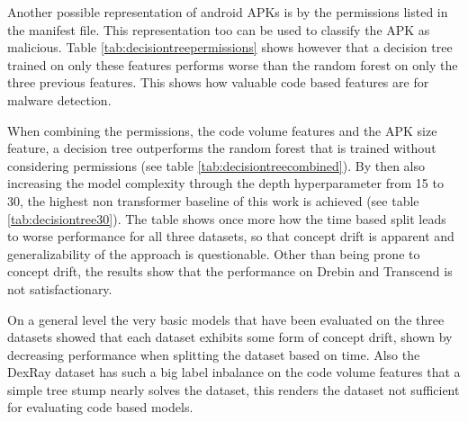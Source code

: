 Another possible representation of android APKs is by the permissions listed in the manifest file.
This representation too can be used to classify the APK as malicious.
Table \ref{tab:decisiontreepermissions} shows however that a decision tree trained on only these features 
performs worse than the random forest on only the three previous features.
This shows how valuable code based features are for malware detection.

When combining the permissions, the code volume features and the APK size feature, 
a decision tree outperforms the random forest that is trained without considering permissions (see table \ref{tab:decisiontreecombined}).
By then also increasing the model complexity through the depth hyperparameter from 15 to 30, 
the highest non transformer baseline of this work is achieved (see table \ref{tab:decisiontree30}).
The table shows once more how the time based split leads to worse performance for all three datasets, 
so that concept drift is apparent and generalizability of the approach is questionable.
Other than being prone to concept drift, the results show that the performance on Drebin and Transcend is not satisfactionary.

On a general level the very basic models that have been evaluated on the three datasets showed that
each dataset exhibits some form of concept drift, shown by decreasing performance when splitting the dataset based on time.
Also the DexRay dataset has such a big label inbalance on the code volume features that a simple tree stump nearly solves the dataset, 
this renders the dataset not sufficient for evaluating code based models.
    
\begin{table}[t]
    \caption{\label{tab:decisiontreepermissions}%
    Decision Tree (max\_depth=15) results by dataset and split. Features include Permissions.}
\end{table}
    
